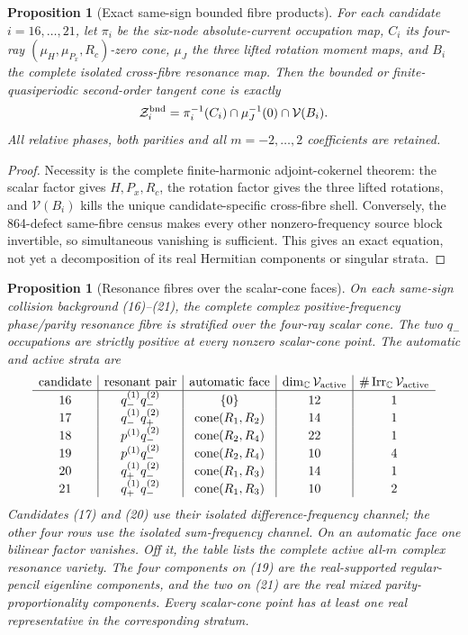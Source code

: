 \documentclass[11pt]{article}
\newtheorem{proposition}[theorem]{Proposition}
\theoremstyle{definition}
\theoremstyle{remark}
\begin{document}
\begin{proposition}[Exact same-sign bounded fibre products]
For each candidate $i=16,\ldots,21$, let \(\pi_i\) be the six-node
absolute-current occupation map, \(C_i\) its four-ray
\((\mu_H,\mu_{P_x},R_c)\)-zero cone, \(\mu_J\) the three lifted rotation
moment maps, and \(B_i\) the complete isolated cross-fibre resonance map.
Then the bounded or finite-quasiperiodic second-order tangent cone is exactly
\[
 \mathcal Z^{\rm bnd}_i
 =\pi_i^{-1}(C_i)\cap\mu_J^{-1}(0)\cap\mathcal V(B_i).
\]
All relative phases, both parities and all $m=-2,\ldots,2$ coefficients are
retained.
\end{proposition}

\begin{proof}
Necessity is the complete finite-harmonic adjoint-cokernel theorem: the scalar
factor gives $H,P_x,R_c$, the rotation factor gives the three lifted
rotations, and \(\mathcal V(B_i)\) kills the unique candidate-specific
cross-fibre shell.  Conversely, the 864-defect same-fibre census makes every
other nonzero-frequency source block invertible, so simultaneous vanishing is
sufficient.  This gives an exact equation, not yet a decomposition of its
real Hermitian components or singular strata.
\end{proof}

\begin{proposition}[Resonance fibres over the scalar-cone faces]
On each same-sign collision background (16)--(21), the complete complex
positive-frequency phase/parity resonance fibre is stratified over the
four-ray scalar cone.  The two $q_-$ occupations are strictly positive at
every nonzero scalar-cone point.  The automatic and active strata are
\[
\begin{array}{c|c|c|c|c}
\text{candidate}&\text{resonant pair}&\text{automatic face}
 &\dim_{\mathbb C}\mathcal V_{\rm active}&\#\operatorname{Irr}_{\mathbb C}\mathcal V_{\rm active}\\ \hline
16&q_-^{(1)}q_-^{(2)}&\{0\}&12&1\\
17&q_-^{(1)}q_+^{(2)}&\operatorname{cone}(R_1,R_2)&14&1\\
18&p^{(1)}q_-^{(2)}&\operatorname{cone}(R_2,R_4)&22&1\\
19&p^{(1)}q_-^{(2)}&\operatorname{cone}(R_2,R_4)&10&4\\
20&q_+^{(1)}q_-^{(2)}&\operatorname{cone}(R_1,R_3)&14&1\\
21&q_+^{(1)}q_-^{(2)}&\operatorname{cone}(R_1,R_3)&10&2
\end{array}
\]
Candidates (17) and (20) use their isolated difference-frequency channel;
the other four rows use the isolated sum-frequency channel.
On an automatic face one bilinear factor vanishes.  Off it, the table lists
the complete active all-$m$ complex resonance variety.  The four components
on (19) are the real-supported regular-pencil eigenline components, and the
two on (21) are the real mixed parity-proportionality components.  Every
scalar-cone point has at least one real representative in the corresponding
stratum.
\end{proposition}
\end{document}
